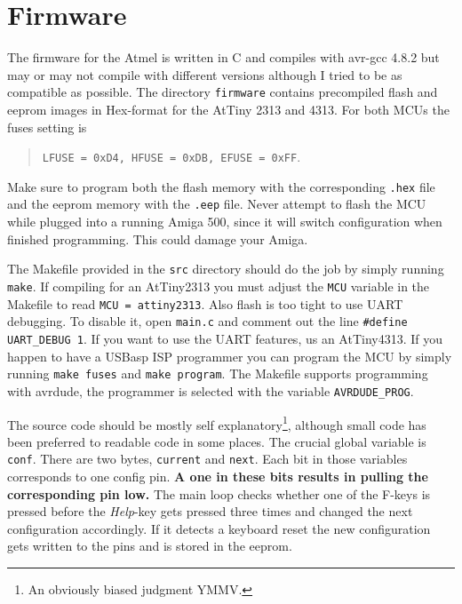 \documentclass[DIV10]{scrartcl}
\begin{document}
\section{Firmware}
The firmware for the Atmel is written in C and compiles with avr-gcc
4.8.2 but may or may not compile with different versions although I
tried to be as compatible as possible. The directory \verb#firmware#
contains precompiled flash and eeprom images in Hex-format for the
AtTiny 2313 and 4313. For both MCUs the fuses setting is
\begin{quote}
  \verb#LFUSE = 0xD4, HFUSE = 0xDB, EFUSE = 0xFF#.
\end{quote}
Make sure to program both the flash memory with the corresponding
\verb#.hex# file and the eeprom memory with the \verb#.eep#
file. Never attempt to flash the MCU while plugged into a running
Amiga 500, since it will switch configuration when finished
programming. This could damage your Amiga.

The Makefile provided in the \texttt{src} directory should do the job
by simply running \texttt{make}. If compiling for an AtTiny2313 you
must adjust the \texttt{MCU} variable in the Makefile to read
\texttt{MCU = attiny2313}. Also flash is too tight to use UART
debugging. To disable it, open \verb#main.c# and comment out the line
\verb!#define UART_DEBUG 1!. If you want to use the UART features, us
an AtTiny4313. If you happen to have a USBasp ISP programmer
\cite{USBasp} you can program the MCU by simply running \texttt{make
  fuses} and \texttt{make program}. The Makefile supports programming
with avrdude, the programmer is selected with the variable
\verb#AVRDUDE_PROG#.

The source code should be mostly self explanatory\footnote{An
  obviously biased judgment YMMV.}, although small code
has been preferred to readable code in some places. The crucial global
variable is \verb#conf#. There are two bytes, \verb#current# and
\verb#next#. Each bit in those variables corresponds to one config
pin.  {\bfseries A one in these bits
  results in pulling the corresponding pin low.}
The main loop checks whether one of the F-keys is pressed before the
\emph{Help}-key gets pressed three times and changed the next
configuration accordingly. If it detects a keyboard reset the new
configuration gets written to the pins and is stored in the eeprom. 
\end{document}
